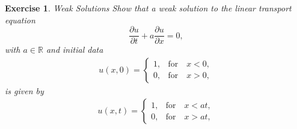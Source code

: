 \documentclass[10pt,letterpaper]{article}
\theoremstyle{break}
\newtheorem{exercise}{Exercise}
\begin{document}
\begin{exercise}{Weak Solutions}
	Show that a weak solution to the linear transport equation 
	$$
		\frac{\partial u}{\partial t} 
		+ 
		a 
		\frac{\partial u}{\partial x}  = 0, 
	$$
	with $a\in \mathbb{R}$ and initial data 
	\begin{align}
		u(x,0) = 
		\left\{
		\begin{array}{ll}
		1, & \text{for} \quad x<0,\\
		0, &\text{for} \quad x > 0,
		\end{array}
		\right.
	\end{align}
	is given by
	\begin{align} 
		u(x,t) = 
		\left\{
		\begin{array}{ll}
		1, & \text{for} \quad x<at,\\
		0, & \text{for} \quad x > at,
		\end{array}
		\right.
	\end{align}
\end{exercise}

\begin{solution}
    
\end{solution}
\end{document}
